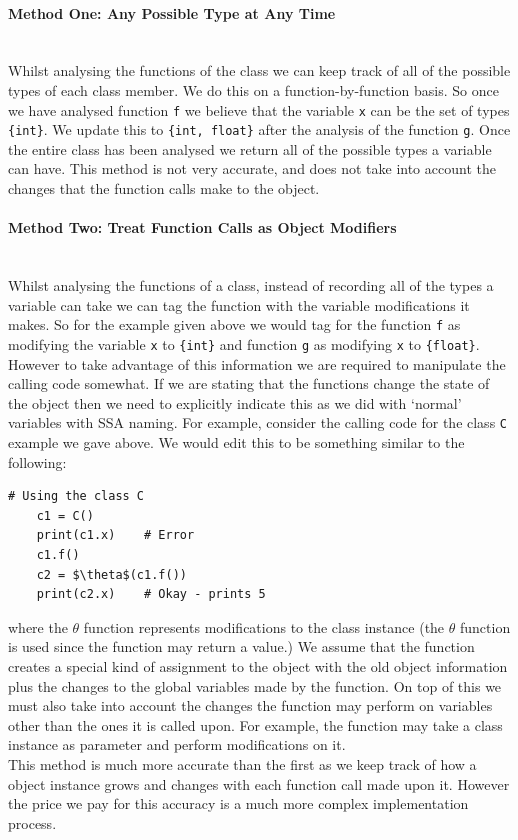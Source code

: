 \documentclass[12pt, titlepage]{article}
\begin{document}
\paragraph{Method One: Any Possible Type at Any Time}\mbox{}\\
Whilst analysing the functions of the class we can keep track of all of the possible types of each class member. We do this on a function-by-function basis. So once we have analysed function \texttt{f} we believe that the variable \texttt{x} can be the set of types \texttt{\{int\}}. We update this to \texttt{\{int, float\}} after the analysis of the function \texttt{g}. Once the entire class has been analysed we return all of the possible types a variable can have. This method is not very accurate, and does not take into account the changes that the function calls make to the object.

\paragraph{Method Two: Treat Function Calls as Object Modifiers}\mbox{}\\
Whilst analysing the functions of a class, instead of recording all of the types a variable can take we can tag the function with the variable modifications it makes. So for the example given above we would tag for the function \texttt{f} as modifying the variable \texttt{x} to \texttt{\{int\}} and function \texttt{g} as modifying \texttt{x} to \texttt{\{float\}}. However to take advantage of this information we are required to manipulate the calling code somewhat. If we are stating that the functions change the state of the object then we need to explicitly indicate this as we did with `normal' variables with SSA naming. For example, consider the calling code for the class \texttt{C} example we gave above. We would edit this to be something similar to the following:
\begin{lstlisting}[mathescape]
    # Using the class C
    c1 = C()
    print(c1.x)    # Error
    c1.f()
    c2 = $\theta$(c1.f())
    print(c2.x)    # Okay - prints 5
\end{lstlisting}
where the $\theta$ function represents modifications to the class instance (the $\theta$ function is used since the function may return a value.) We assume that the function creates a special kind of assignment to the object with the old object information plus the changes to the global variables made by the function. On top of this we must also take into account the changes the function may perform on variables other than the ones it is called upon. For example, the function may take a class instance as parameter and perform modifications on it. \\
\indent This method is much more accurate than the first as we keep track of how a object instance grows and changes with each function call made upon it. However the price we pay for this accuracy is a much more complex implementation process.
\end{document}
